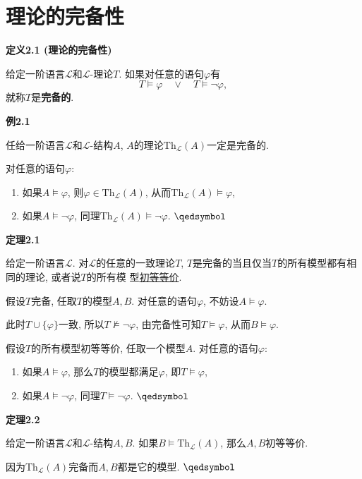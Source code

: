 \newpage

\section{理论的完备性}

\hypertarget{sec:定义2.1}{}
\noindent\textbf{定义2.1 (理论的完备性)}

给定一阶语言$\mathcal{L}$和$\mathcal{L}$-理论$T$. 如果对任意的语句$\varphi$有
\[
    T\models\varphi\quad\lor\quad T\models\neg\varphi,
\]
就称$T$是\textbf{完备的}.

\vspace{10pt}

\hypertarget{sec:例2.1}{}
\noindent\textbf{例2.1}

任给一阶语言$\mathcal{L}$和$\mathcal{L}$-结构$A$,
$A$的理论$\mathrm{Th}_{\mathcal{L}}(A)$一定是完备的.


对任意的语句$\varphi$:
\begin{enumerate}
    \item 如果$A\models\varphi$, 则$\varphi\in\mathrm{Th}_{\mathcal{L}}(A)$,
    从而$\mathrm{Th}_{\mathcal{L}}(A)\models\varphi$,
    \item 如果$A\models\neg\varphi$,
    同理$\mathrm{Th}_{\mathcal{L}}(A)\models\neg\varphi$. \hfill $\qedsymbol$
\end{enumerate}

\vspace{10pt}

\hypertarget{sec:定理2.1}{}
\noindent\textbf{定理2.1}

给定一阶语言$\mathcal{L}$. 对$\mathcal{L}$的任意的一致理论$T$,
$T$是完备的当且仅当$T$的所有模型都有相同的理论, 或者说$T$的所有模
型\href{../04 Löwenheim-Skolem 定理/02 初等等价#nameddest=sec:定义1.1}{初等等价}.



假设$T$完备, 任取$T$的模型$A,B$. 对任意的语句$\varphi$, 不妨设$A\models\varphi$.

此时$T\cup\{\varphi\}$一致, 所以$T\not\models\neg\varphi$,
由完备性可知$T\models\varphi$, 从而$B\models\varphi$.


假设$T$的所有模型初等等价, 任取一个模型$A$. 对任意的语句$\varphi$:
\begin{enumerate}
    \item 如果$A\models\varphi$, 那么$T$的模型都满足$\varphi$, 即$T\models\varphi$,
    \item 如果$A\models\neg\varphi$, 同理$T\models\neg\varphi$. \hfill $\qedsymbol$
\end{enumerate}

\vspace{10pt}

\hypertarget{sec:定理2.2}{}
\noindent\textbf{定理2.2}

给定一阶语言$\mathcal{L}$和$\mathcal{L}$-结构$A,B$.
如果$B\models\mathrm{Th}_{\mathcal{L}}(A)$, 那么$A,B$初等等价.


因为$\mathrm{Th}_{\mathcal{L}}(A)$完备而$A,B$都是它的模型. \hfill $\qedsymbol$

